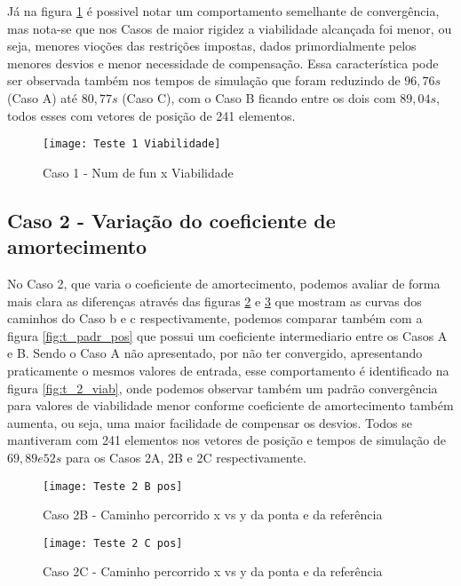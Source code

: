 Já na figura \ref{fig:t_1_viab} é possivel notar um comportamento semelhante de convergência, mas nota-se que
nos Casos de maior rigidez a viabilidade alcançada foi menor, ou seja, menores vioções das restrições impostas, dados
primordialmente pelos menores desvios e menor necessidade de compensação.
Essa característica pode ser observada também nos tempos de simulação que foram reduzindo de $96,76 s$ (Caso A) até
$80,77 s$ (Caso C), com o Caso B ficando entre os dois com $89,04 s$, todos esses com vetores de posição de 241 elementos.

\begin{figure}[H]
    \begin{center}
    \caption{Caso 1 - Num de fun x Viabilidade}
    \texttt{[image: Teste 1 Viabilidade]}
    \label{fig:t_1_viab}
    \end{center}
\end{figure}

\subsection{Caso 2 - Variação do coeficiente de amortecimento}
No Caso 2, que varia o coeficiente de amortecimento, podemos avaliar de forma mais clara as diferenças através das figuras
\ref{fig:t_2b_pos} e \ref{fig:t_2c_pos} que mostram as curvas dos caminhos do Caso b e c respectivamente, podemos comparar também
com a figura \ref{fig:t_padr_pos} que possui um coeficiente intermediario entre os Casos A e B.
Sendo o Caso A não apresentado, por não ter convergido, apresentando praticamente o mesmos valores de entrada, esse comportamento
é identificado na figura \ref{fig:t_2_viab}, onde podemos observar também um padrão convergência para valores de viabilidade menor conforme
coeficiente de amortecimento também aumenta, ou seja, uma maior facilidade de compensar os desvios.
Todos se mantiveram com 241 elementos nos vetores de posição e tempos de simulação de $69, 89 e 52 s$ para os Casos 2A, 2B e 2C respectivamente.

\begin{figure}[H]
    \begin{center}
    \caption{Caso 2B - Caminho percorrido x vs y da ponta e da referência}
    \texttt{[image: Teste 2 B pos]}
    \label{fig:t_2b_pos}
    \end{center}
\end{figure}

\begin{figure}[H]
    \begin{center}
    \caption{Caso 2C - Caminho percorrido x vs y da ponta e da referência}
    \texttt{[image: Teste 2 C pos]}
    \label{fig:t_2c_pos}
    \end{center}
\end{figure}

